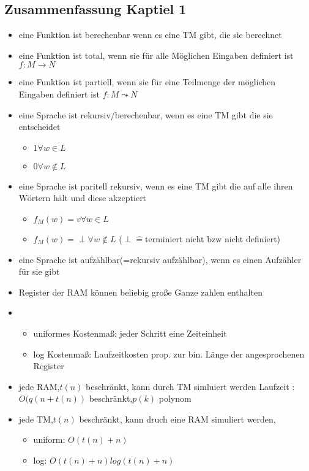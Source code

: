 \documentclass[a4paper, 10pt]{article}
\theoremstyle{definition}
\begin{document}
\subsection{Zusammenfassung Kaptiel 1}
\begin{itemize}
\item eine Funktion ist berechenbar wenn es eine TM gibt, die sie berechnet
\item eine Funktion ist total, wenn sie für alle Möglichen Eingaben definiert ist $f:M\to N$
\item eine Funktion ist partiell, wenn sie für eine Teilmenge der möglichen Eingaben definiert ist $f:M\leadsto N$
\item eine Sprache ist rekursiv/berechenbar, wenn es eine TM gibt die sie entscheidet\begin{itemize}
\item $1\forall w \in L$
\item $0\forall w\not\in L$
\end{itemize}
\item eine Sprache ist paritell rekursiv, wenn es eine TM gibt die auf alle ihren Wörtern hält und diese akzeptiert\begin{itemize}
\item $f_M(w)=v\forall w\in L$
\item $f_M(w)=\perp\forall w\not\in L$ ($\perp\widehat{=}$terminiert nicht bzw nicht definiert)
\end{itemize}
\item eine Sprache ist aufzählbar(=rekursiv aufzählbar), wenn es einen Aufzähler für sie gibt
\item Register der RAM können beliebig große Ganze zahlen enthalten
\item \begin{itemize}
    \item uniformes Kostenmaß: jeder Schritt eine Zeiteinheit
    \item log Kostenmaß: Laufzeitkosten prop. zur bin. Länge der angesprochenen Register
\end{itemize}
\item jede RAM,$t(n)$ beschränkt, kann durch TM simluiert werden Laufzeit : $O(q(n+t(n))$ beschränkt,$p(k)$ polynom
\item jede TM,$t(n)$ beschränkt, kann druch eine RAM simuliert werden, 
\begin{itemize}
    \item uniform: $O(t(n)+n)$ 
    \item log: $O(t(n)+n)log(t(n)+n)$
\end{itemize}

\end{itemize}
\newpage
\end{document}
